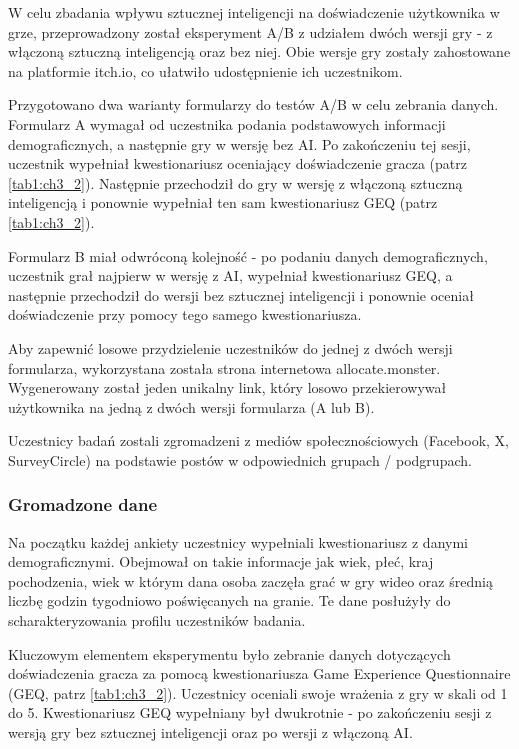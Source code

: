 W celu zbadania wpływu sztucznej inteligencji na doświadczenie użytkownika w grze, przeprowadzony
został eksperyment A/B z udziałem dwóch wersji gry - z włączoną sztuczną inteligencją oraz bez niej.
Obie wersje gry zostały zahostowane na platformie itch.io, co ułatwiło udostępnienie ich uczestnikom.

Przygotowano dwa warianty formularzy do testów A/B w celu zebrania danych. Formularz A wymagał od
uczestnika podania podstawowych informacji demograficznych, a następnie gry w wersję bez AI. Po
zakończeniu tej sesji, uczestnik wypełniał kwestionariusz oceniający doświadczenie gracza (patrz \ref{tab1:ch3_2}).
Następnie przechodził do gry w wersję z włączoną sztuczną inteligencją i ponownie wypełniał ten
sam kwestionariusz GEQ (patrz \ref{tab1:ch3_2}).

Formularz B miał odwróconą kolejność - po podaniu danych demograficznych, uczestnik grał najpierw
w wersję z AI, wypełniał kwestionariusz GEQ, a następnie przechodził do wersji bez sztucznej
inteligencji i ponownie oceniał doświadczenie przy pomocy tego samego kwestionariusza.

Aby zapewnić losowe przydzielenie uczestników do jednej z dwóch wersji formularza, wykorzystana
została strona internetowa allocate.monster. Wygenerowany został jeden unikalny link, który losowo
przekierowywał użytkownika na jedną z dwóch wersji formularza (A lub B).

Uczestnicy badań zostali zgromadzeni z mediów społecznościowych (Facebook, X, SurveyCircle) na podstawie
postów w odpowiednich grupach / podgrupach.

\subsubsection*{Gromadzone dane}

Na początku każdej ankiety uczestnicy wypełniali kwestionariusz z danymi demograficznymi. Obejmował
on takie informacje jak wiek, płeć, kraj pochodzenia, wiek w którym dana osoba zaczęła grać w gry
wideo oraz średnią liczbę godzin tygodniowo poświęcanych na granie. Te dane posłużyły do
scharakteryzowania profilu uczestników badania.

Kluczowym elementem eksperymentu było zebranie danych dotyczących doświadczenia gracza za pomocą
kwestionariusza Game Experience Questionnaire (GEQ, patrz \ref{tab1:ch3_2}). Uczestnicy oceniali swoje
wrażenia z gry w skali od 1 do 5. Kwestionariusz GEQ wypełniany był dwukrotnie - po zakończeniu sesji z
wersją gry bez sztucznej inteligencji oraz po wersji z włączoną AI.

